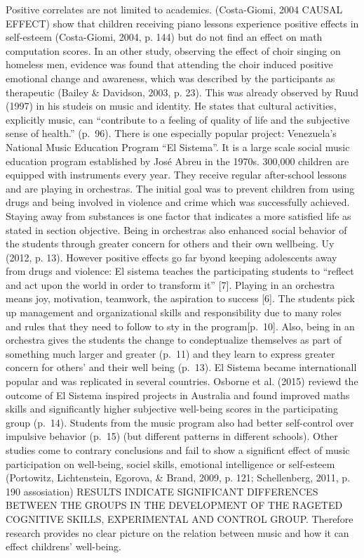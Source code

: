 \documentclass[a4, 12pt]{article}
\begin{document}
Positive correlates are not limited to academics. (Costa-Giomi, 2004 CAUSAL EFFECT) show that children receiving piano lessons experience positive effects in self-esteem (Costa-Giomi, 2004, p. 144) but do not find an effect on math computation scores. In an other study, observing the effect of choir singing on homeless men, evidence was found that attending the choir induced positive emotional change and awareness, which was described by the participants as therapeutic (Bailey \& Davidson, 2003, p. 23). This was already observed by Ruud (1997) in his studeis on music and identity. He states that cultural activities, explicitly music, can ``contribute to a feeling of quality of life and the subjective sense of health.'' (p.~96). There is one especially popular project: Venezuela's National Music Education Program ``El Sistema''. It is a large scale social music education program established by José Abreu in the 1970s. 300,000 children are equipped with instruments every year. They receive regular after-school lessons and are playing in orchestras. The initial goal was to prevent children from using drugs and being involved in violence and crime which was successfully achieved. Staying away from substances is one factor that indicates a more satisfied life as stated in section objective. Being in orchestras also enhanced social behavior of the students through greater concern for others and their own wellbeing. Uy (2012, p. 13). However positive effects go far byond keeping adolescents away from drugs and violence: El sistema teaches the participating students to ``reflect and act upon the world in order to transform it'' {[}7{]}. Playing in an orchestra means joy, motivation, teamwork, the aspiration to success {[}6{]}. The students pick up management and organizational skills and responsibility due to many roles and rules that they need to follow to sty in the program{[}p.~10{]}. Also, being in an orchestra gives the students the change to condeptualize themselves as part of something much larger and greater (p.~11) and they learn to express greater concern for others' and their well being (p.~13). El Sistema became internationall popular and was replicated in several countries. Osborne et al. (2015) reviewd the outcome of El Sistema inspired projects in Australia and found improved maths skills and significantly higher subjective well-being scores in the participating group (p.~14). Students from the music program also had better self-control over impulsive behavior (p.~15) (but different patterns in different schools). Other studies come to contrary conclusions and fail to show a significnt effect of music participation on well-being, sociel skills, emotional intelligence or self-esteem (Portowitz, Lichtenstein, Egorova, \& Brand, 2009, p. 121; Schellenberg, 2011, p. 190 assosiation) RESULTS INDICATE SIGNIFICANT DIFFERENCES BETWEEN THE GROUPS IN THE DEVELOPMENT OF THE RAGETED COGNITIVE SKILLS, EXPERIMENTAL AND CONTROL GROUP. Therefore research provides no clear picture on the relation between music and how it can effect childrens' well-being.
\end{document}
